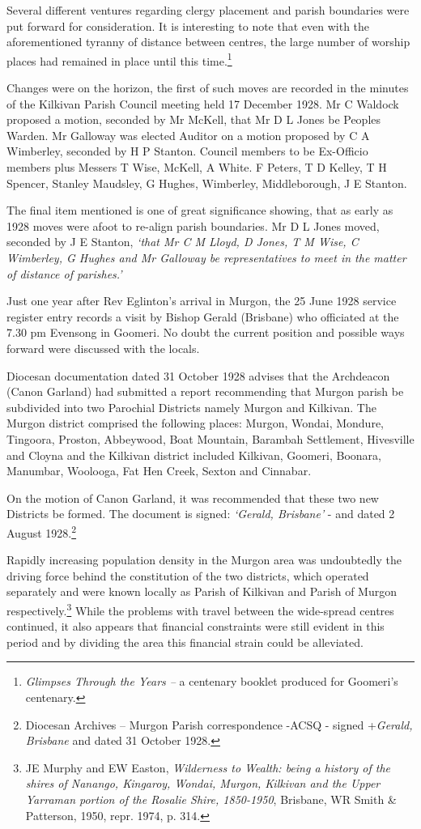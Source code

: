 Several different ventures regarding clergy placement and parish boundaries were put forward for consideration. It is interesting to note that even with the aforementioned tyranny of distance between centres, the large number of worship places had remained in place until this time.\footnote{\emph{Glimpses Through the Years --} a centenary booklet produced for Goomeri's centenary.}

Changes were on the horizon, the first of such moves are recorded in the minutes of the Kilkivan Parish Council meeting held 17 December 1928. Mr C Waldock proposed a motion, seconded by Mr McKell, that Mr D L Jones be Peoples Warden. Mr Galloway was elected Auditor on a motion proposed by C A Wimberley, seconded by H P Stanton. Council members to be Ex-Officio members plus Messers T Wise, McKell, A White. F Peters, T D Kelley, T H Spencer, Stanley Maudsley, G Hughes, Wimberley, Middleborough, J E Stanton.

The final item mentioned is one of great significance showing, that as early as 1928 moves were afoot to re-align parish boundaries. Mr D L Jones moved, seconded by J E Stanton, \emph{`that Mr C M Lloyd, D Jones, T M Wise, C Wimberley, G Hughes and Mr Galloway be representatives to meet in the matter of distance of parishes.'}

Just one year after Rev Eglinton's arrival in Murgon, the 25 June 1928 service register entry records a visit by Bishop Gerald (Brisbane) who officiated at the 7.30 pm Evensong in Goomeri. No doubt the current position and possible ways forward were discussed with the locals.

Diocesan documentation dated 31 October 1928 advises that the Archdeacon (Canon Garland) had submitted a report recommending that Murgon parish be subdivided into two Parochial Districts namely Murgon and Kilkivan. The Murgon district comprised the following places: Murgon, Wondai, Mondure, Tingoora, Proston, Abbeywood, Boat Mountain, Barambah Settlement, Hivesville and Cloyna and the Kilkivan district included Kilkivan, Goomeri, Boonara, Manumbar, Woolooga, Fat Hen Creek, Sexton and Cinnabar.

On the motion of Canon Garland, it was recommended that these two new Districts be formed. The document is signed: \emph{`Gerald, Brisbane'} - and dated 2 August 1928.\footnote{Diocesan Archives -- Murgon Parish correspondence -ACSQ - signed +\emph{Gerald, Brisbane} and dated 31 October 1928.}

Rapidly increasing population density in the Murgon area was undoubtedly the driving force behind the constitution of the two districts, which operated separately and were known locally as Parish of Kilkivan and Parish of Murgon respectively.\footnote{JE Murphy and EW Easton, \emph{Wilderness to Wealth: being a history of the shires of Nanango, Kingaroy, Wondai, Murgon, Kilkivan and the Upper Yarraman portion of the Rosalie Shire, 1850-1950}, Brisbane, WR Smith \& Patterson, 1950, repr. 1974, p. 314.} While the problems with travel between the wide-spread centres continued, it also appears that financial constraints were still evident in this period and by dividing the area this financial strain could be alleviated.

